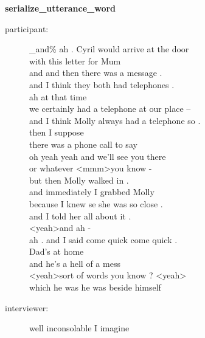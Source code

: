 \documentclass{article}
\newcommand{\turn}[2]{
\item[#1:] #2
}
\begin{document}
\begin{center}\textbf{serialize\_utterance\_word}\end{center}

\begin{description}

\turn{participant}{\_and\% ah . Cyril would arrive at the door\\
with this letter for Mum\\
and and then there was a message .\\
and I think they both had telephones .\\
ah at that time\\
we certainly had a telephone at our place --\\
and I think Molly always had a telephone so .\\
then I suppose\\
there was a phone call to say\\
oh yeah yeah and we'll see you there\\
or whatever \textless mmm\textgreater  you know -\\
but then Molly walked in .\\
and immediately I grabbed Molly\\
because I knew se she was so close .\\
and I told her all about it .\\
\textless yeah\textgreater  and ah -\\
ah . and I said come quick come quick .\\
Dad's at home\\
and he's a hell of a mess\\
\textless yeah\textgreater  sort of words you know ? \textless yeah\textgreater \\
which he was he was beside himself}

\turn{interviewer}{well inconsolable I imagine}


\end{description}
\end{document}
